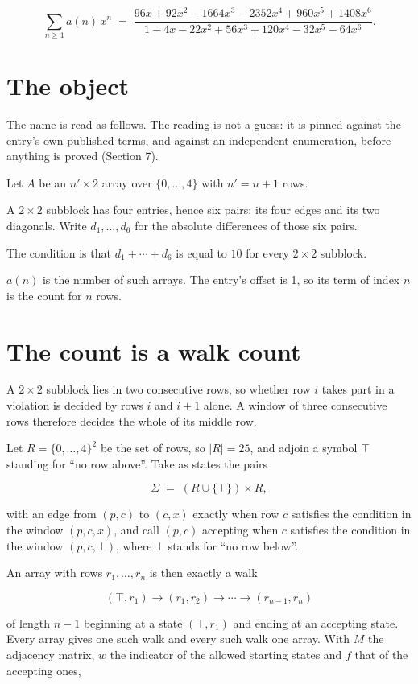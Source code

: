 \documentclass[11pt]{article}
\theoremstyle{definition}
\begin{document}
\[\sum_{n \ge 1} a(n)\,x^n \;=\; \frac{96x + 92x^{2} - 1664x^{3} - 2352x^{4} + 960x^{5} + 1408x^{6}}{1 - 4x - 22x^{2} + 56x^{3} + 120x^{4} - 32x^{5} - 64x^{6}}.\]

\section{The object}

The name is read as follows. The reading is not a guess: it is pinned against the entry's own published terms, and against an independent enumeration, before anything is proved (Section 7).

Let $A$ be an $n' \times 2$ array over $\{0,\dots,4\}$ with $n' = n + 1$ rows.

A $2\times2$ subblock has four entries, hence six pairs: its four edges and its two diagonals. Write $d_1,\dots,d_6$ for the absolute differences of those six pairs.

The condition is that $d_1+\cdots+d_6$ is equal to $10$ for every $2\times2$ subblock.

$a(n)$ is the number of such arrays. The entry's offset is 1, so its term of index $n$ is the count for $n$ rows.

\section{The count is a walk count}

A $2\times2$ subblock lies in two consecutive rows, so whether row $i$ takes part in a violation is decided by rows $i$ and $i+1$ alone. A window of three consecutive rows therefore decides the whole of its middle row.

Let $R = \{0,\dots,4\}^{2}$ be the set of rows, so $|R| = 25$, and adjoin a symbol $\top$ standing for ``no row above''. Take as states the pairs

\[\Sigma \;=\; (R \cup \{\top\}) \times R,\]

with an edge from $(p,c)$ to $(c,x)$ exactly when row $c$ satisfies the condition in the window $(p,c,x)$, and call $(p,c)$ accepting when $c$ satisfies the condition in the window $(p,c,\bot)$, where $\bot$ stands for ``no row below''.

An array with rows $r_1,\dots,r_n$ is then exactly a walk

\[(\top,r_1) \to (r_1,r_2) \to \cdots \to (r_{n-1},r_n)\]

of length $n-1$ beginning at a state $(\top,r_1)$ and ending at an accepting state. Every array gives one such walk and every such walk one array. With $M$ the adjacency matrix, $w$ the indicator of the allowed starting states and $f$ that of the accepting ones,
\end{document}
